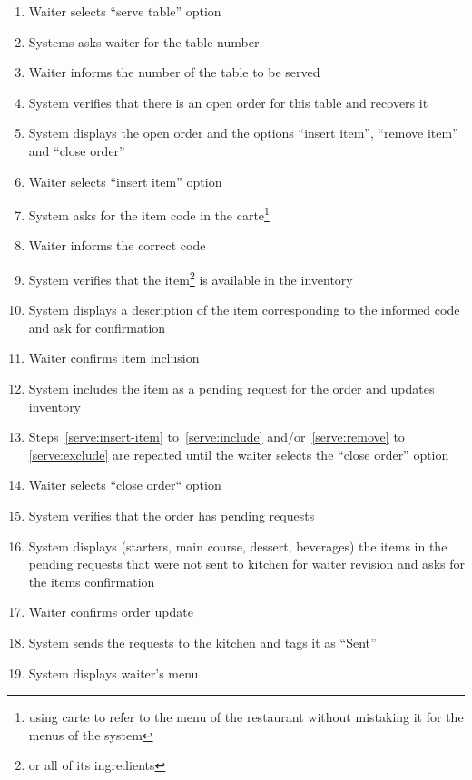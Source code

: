 \documentclass[a4paper,11pt,oneside]{book}
\newcommand{\tinytodo}[2][]{\todo[caption={#2}, size=\footnotesize, #1]{\renewcommand{\baselinestretch}{0.5}\selectfont#2\par}}
\newcommand{\menu}[1]{System displays #1's menu}
\begin{document}
\begin{enumerate}
  \item Waiter selects ``serve table'' option
  \item \label{serve:ask-number} Systems asks waiter for the table number
  \item \label{serve:inform-number} Waiter informs the number of the table to be served
  \item \label{serve:verify-number} System verifies that there is an open order for this table and recovers it
  \item \label{serve:options} System displays the open order and the options ``insert item'', ``remove item'' and ``close order''
  \item \label{serve:insert-item} Waiter selects ``insert item'' option
  \item \label{serve:ask-item}System asks for the item code in the carte\footnote{using carte to refer to the menu of the restaurant without mistaking it for the menus of the system}
  \item \label{serve:insert-code} Waiter informs the correct code
  \item \label{serve:verify-item} System verifies that the item\footnote{or all of its ingredients} is available in the inventory
  \item System displays a description of the item corresponding to the informed code and ask for confirmation
  \item \label{serve:confirm-item} Waiter confirms item inclusion
  \item \label{serve:include} System includes the item as a pending request for the order and updates inventory
  \item Steps~\ref{serve:insert-item} to~\ref{serve:include} and/or~\ref{serve:remove} to \ref{serve:exclude} are repeated until the waiter selects the ``close order'' option
  \item Waiter selects ``close order`` option
  \item \label{serve:verify-order} System verifies that the order has pending requests
  \item System displays (starters, main course, dessert, beverages) the items in the pending requests that were not sent to kitchen for waiter revision and asks for the items confirmation
  \item \label{serve:confirm-order} Waiter confirms order update \tinytodo{review: when is the order created?}
  \item System sends the requests to the kitchen and tags it as ``Sent''
  \item \menu{waiter}
\end{enumerate}
\end{document}

